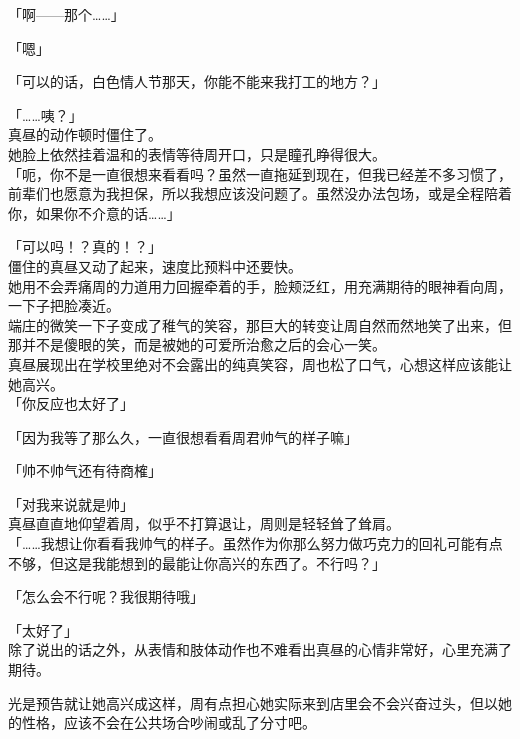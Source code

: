 「啊——那个……」

「嗯」

「可以的话，白色情人节那天，你能不能来我打工的地方？」

「……咦？」\\

真昼的动作顿时僵住了。\\

她脸上依然挂着温和的表情等待周开口，只是瞳孔睁得很大。\\

「呃，你不是一直很想来看看吗？虽然一直拖延到现在，但我已经差不多习惯了，前辈们也愿意为我担保，所以我想应该没问题了。虽然没办法包场，或是全程陪着你，如果你不介意的话……」

「可以吗！？真的！？」\\

僵住的真昼又动了起来，速度比预料中还要快。\\

她用不会弄痛周的力道用力回握牵着的手，脸颊泛红，用充满期待的眼神看向周，一下子把脸凑近。\\

端庄的微笑一下子变成了稚气的笑容，那巨大的转变让周自然而然地笑了出来，但那并不是傻眼的笑，而是被她的可爱所治愈之后的会心一笑。\\

真昼展现出在学校里绝对不会露出的纯真笑容，周也松了口气，心想这样应该能让她高兴。\\

「你反应也太好了」

「因为我等了那么久，一直很想看看周君帅气的样子嘛」

「帅不帅气还有待商榷」

「对我来说就是帅」\\

真昼直直地仰望着周，似乎不打算退让，周则是轻轻耸了耸肩。\\

「……我想让你看看我帅气的样子。虽然作为你那么努力做巧克力的回礼可能有点不够，但这是我能想到的最能让你高兴的东西了。不行吗？」

「怎么会不行呢？我很期待哦」

「太好了」\\

除了说出的话之外，从表情和肢体动作也不难看出真昼的心情非常好，心里充满了期待。

光是预告就让她高兴成这样，周有点担心她实际来到店里会不会兴奋过头，但以她的性格，应该不会在公共场合吵闹或乱了分寸吧。\\

